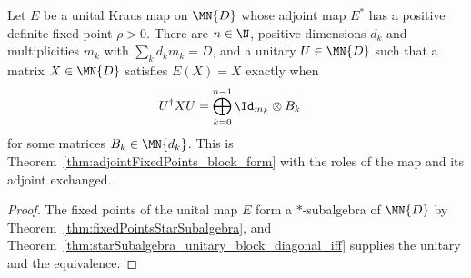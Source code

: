 \begin{theorem}%
    \label{thm:fixedPoints_block_form}
    \leanok
    Let $E$ be a unital Kraus map on $\MN{D}$ whose adjoint map $E^*$ has a
    positive definite fixed point $\rho>0$. There are $n\in\N$, positive
    dimensions $d_k$ and multiplicities $m_k$ with
    $\sum_kd_km_k=D$, and a unitary $U\in\MN{D}$ such that a matrix
    $X\in\MN{D}$ satisfies $E(X)=X$ exactly when
    \begin{align}
        U^\dagger XU
        &=\bigoplus_{k=0}^{n-1}\Id_{m_k}\otimes B_k
        \notag
    \end{align}
    for some matrices $B_k\in\MN{d_k}$. This is
    Theorem~\ref{thm:adjointFixedPoints_block_form} with the roles of the
    map and its adjoint exchanged.
\end{theorem}

\begin{proof}
    \leanok
    The fixed points of the unital map $E$ form a $*$-subalgebra of
    $\MN{D}$ by Theorem~\ref{thm:fixedPointsStarSubalgebra}, and
    Theorem~\ref{thm:starSubalgebra_unitary_block_diagonal_iff} supplies
    the unitary and the equivalence.
\end{proof}

